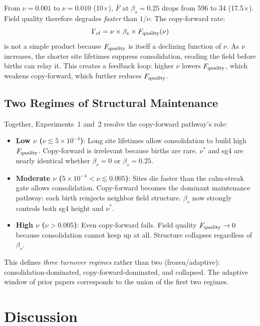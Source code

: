 \documentclass[11pt]{article}
\begin{document}
From $\nu=0.001$ to $\nu=0.010$ (10$\times$), $\bar{F}$ at $\beta_s=0.25$
drops from 596 to 34 (17.5$\times$). Field quality therefore degrades
\emph{faster} than $1/\nu$. The copy-forward rate:
\[
\Gamma_{\rm cf} = \nu \times \beta_s \times F_{\rm quality}(\nu)
\]
is not a simple product because $F_{\rm quality}$ is itself a declining
function of $\nu$. As $\nu$ increases, the shorter site lifetimes suppress
consolidation, eroding the field before births can relay it. This creates a
feedback loop: higher $\nu$ lowers $F_{\rm quality}$, which weakens
copy-forward, which further reduces $F_{\rm quality}$.

\subsection{Two Regimes of Structural Maintenance}

Together, Experiments~1 and~2 resolve the copy-forward pathway's role:

\begin{itemize}
\item \textbf{Low $\nu$ ($\nu \lesssim 5\times10^{-4}$)}: Long site lifetimes
allow consolidation to build high $F_{\rm quality}$. Copy-forward is
irrelevant because births are rare. $\nu^*$ and sg4 are nearly identical
whether $\beta_s=0$ or $\beta_s=0.25$.

\item \textbf{Moderate $\nu$ ($5\times10^{-4} < \nu \lesssim 0.005$)}: Sites
die faster than the calm-streak gate allows consolidation. Copy-forward
becomes the dominant maintenance pathway: each birth reinjects neighbor
field structure. $\beta_s$ now strongly controls both sg4 height and $\nu^*$.

\item \textbf{High $\nu$ ($\nu > 0.005$)}: Even copy-forward fails.
Field quality $F_{\rm quality} \to 0$ because consolidation cannot keep up
at all. Structure collapses regardless of $\beta_s$.
\end{itemize}

This defines \emph{three turnover regimes} rather than two (frozen/adaptive):
consolidation-dominated, copy-forward-dominated, and collapsed. The adaptive
window of prior papers corresponds to the union of the first two regimes.

\section{Discussion}
\end{document}
